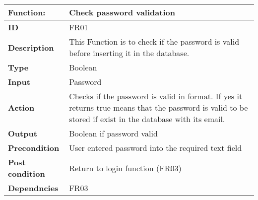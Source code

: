 \documentclass[]{article}
\begin{document}
\FloatBarrier
\begin{table}[h]
\caption{ }
\label{tab:my-table}
\begin{tabular}{|p{}|p{}|}
\hline
\textbf{Function:} & Check password validation
\\ \hline
\textbf{ID}  &     FR01       

\\ \hline
\textbf{Description}    &      This Function is to check if the password is valid before inserting it in the database.                                                              
\\ \hline
\textbf{Type}    &         Boolean

\\ \hline
\textbf{Input}        & Password


\\ \hline
\textbf{Action}            & Checks if the password is valid in format. If yes it returns true means that the password is valid to be stored if exist in the database with its email.

\\ \hline
\textbf{Output}            & Boolean if password valid

\\ \hline
\textbf{Precondition}           &   User entered password into the required text field

\\ \hline
\textbf{Post condition}           & Return to login function (FR03)


\\ \hline
\textbf{Dependncies}           & FR03
\\ \hline
\end{tabular}
\end{table}
\end{document}
